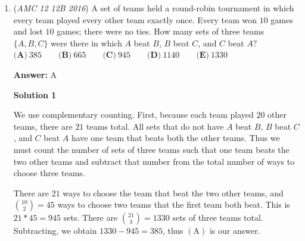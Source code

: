 \begin{enumerate}
 $x=\frac{1}{8}+\left(\frac{1}{8}\right)^2+\left(\frac{1}{8}\right)^3...$

 And then we find that $x$ equals to $\boxed{\textbf{(B)}\ \frac{1}{7}}$ because of the formula of the sum for an infinite series, $\frac{\frac{1}{8}}{1-\frac{1}{8}} = \frac{1}{8}*\frac{8}{7} = \frac{1}{7}$.

 


 



\textbf{Solution 2}

Call it a "win" if the boys all flip their coins the same number of times, and the probability that they win is $P$. The probability that they win on their first flip is $\frac{1}{8}$. If they don't win on their first flip, that means they all flipped tails (which also happens with probability $\frac{1}{8}$ ) and that their chances of winning have returned to what they were at the beginning. This covers all possible sequences of winning flips. So we have

 $P = \frac{1}{8} + \frac{1}{8}P$

 Solving for $P$ gives $\boxed{\textbf{(B)}\ \frac{1}{7}}$.

 


	\item (\textit{AMC 12 12B 2016}) A set of teams held a round-robin tournament in which every team played every other team exactly once. Every team won $10$ games and lost $10$ games; there were no ties. How many sets of three teams $\{A, B, C\}$ were there in which $A$ beat $B$, $B$ beat $C$, and $C$ beat $A?$
$\textbf{(A)}\ 385 \qquad \textbf{(B)}\ 665 \qquad \textbf{(C)}\ 945 \qquad \textbf{(D)}\ 1140 \qquad \textbf{(E)}\ 1330$

 \textbf{Answer: }A



\textbf{Solution 1}

We use complementary counting. First, because each team played $20$ other teams, there are $21$ teams total. All sets that do not have $A$ beat $B$, $B$ beat $C$, and $C$ beat $A$ have one team that beats both the other teams. Thus we must count the number of sets of three teams such that one team beats the two other teams and subtract that number from the total number of ways to choose three teams.

 There are $21$ ways to choose the team that beat the two other teams, and $\binom{10}{2} = 45$ ways to choose two teams that the first team both beat. This is $21 * 45 = 945$ sets. There are $\binom{21}{3} = 1330$ sets of three teams total. Subtracting, we obtain $1330 - 945 = \boxed{385}$, thus $(\text{A})$  is our answer.


\end{enumerate}
